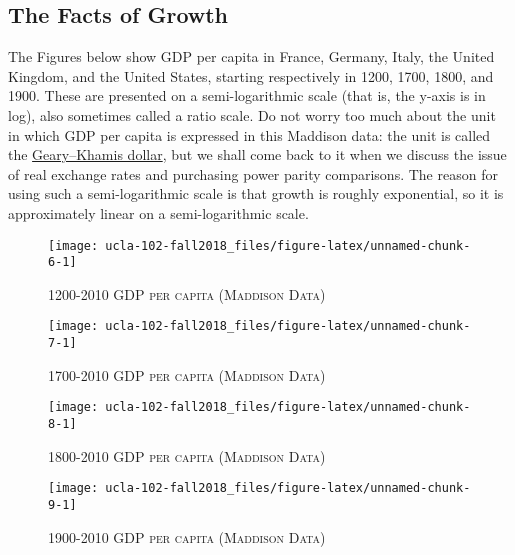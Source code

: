 \documentclass[]{book}
\theoremstyle{definition}
\theoremstyle{definition}
\theoremstyle{definition}
\theoremstyle{remark}
\begin{document}
\subsection{The Facts of Growth}\label{the-facts-of-growth}

The Figures below show GDP per capita in France, Germany, Italy, the
United Kingdom, and the United States, starting respectively in 1200,
1700, 1800, and 1900. These are presented on a semi-logarithmic scale
(that is, the y-axis is in log), also sometimes called a ratio scale. Do
not worry too much about the unit in which GDP per capita is expressed
in this Maddison data: the unit is called the
\href{https://en.wikipedia.org/wiki/Geary\%E2\%80\%93Khamis_dollar}{Geary--Khamis
dollar}, but we shall come back to it when we discuss the issue of real
exchange rates and purchasing power parity comparisons. The reason for
using such a semi-logarithmic scale is that growth is roughly
exponential, so it is approximately linear on a semi-logarithmic scale.

\begin{figure}

{\centering \texttt{[image: ucla-102-fall2018\_files/figure-latex/unnamed-chunk-6-1]} 

}

\caption{\label{fig:maddison1}\textsc{1200-2010 GDP per capita (Maddison Data)}}\label{fig:unnamed-chunk-6}
\end{figure}

\begin{figure}

{\centering \texttt{[image: ucla-102-fall2018\_files/figure-latex/unnamed-chunk-7-1]} 

}

\caption{\label{fig:maddison2}\textsc{1700-2010 GDP per capita (Maddison Data)}}\label{fig:unnamed-chunk-7}
\end{figure}

\begin{figure}

{\centering \texttt{[image: ucla-102-fall2018\_files/figure-latex/unnamed-chunk-8-1]} 

}

\caption{\label{fig:maddison3}\textsc{1800-2010 GDP per capita (Maddison Data)}}\label{fig:unnamed-chunk-8}
\end{figure}

\begin{figure}

{\centering \texttt{[image: ucla-102-fall2018\_files/figure-latex/unnamed-chunk-9-1]} 

}

\caption{\label{fig:maddison4}\textsc{1900-2010 GDP per capita (Maddison Data)}}\label{fig:unnamed-chunk-9}
\end{figure}
\end{document}
